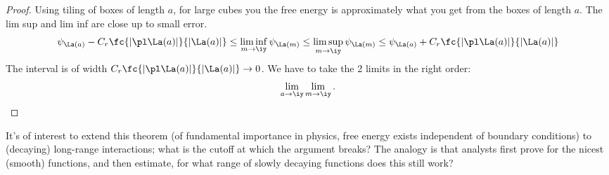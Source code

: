 \begin{proof}
Using tiling of boxes of length $a$, for large cubes you the free energy is approximately what you get from the boxes of length $a$. 
The lim sup and lim inf are close up to small error.
\[
\psi_{\La(a)}-C_r \fc{|\pl \La (a)|}{|\La(a)|}
\le
\liminf_{m\to \iy} \psi_{\La(m)}\le \limsup_{m\to \iy} \psi_{\La(m)} 
\le 
\psi_{\La(a)}+C_r \fc{|\pl \La (a)|}{|\La(a)|}
\]
The interval is of width $C_r \fc{|\pl \La (a)|}{|\La(a)|}\to 0$. We have to take the 2 limits in the right order:
\[
\lim_{a\to \iy}\lim_{m\to \iy}.
\]
\end{proof}

It's of interest to extend this theorem (of fundamental importance in physics, free energy exists independent of boundary conditions) to (decaying) long-range interactions; what is the cutoff at which the argument breaks? The analogy is that analysts first prove for the nicest (smooth) functions, and then estimate, for what range of slowly decaying functions does this still work?